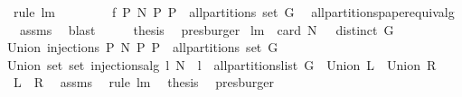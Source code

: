 \begin{isabellebody}
\ {\isacharparenleft}rule\ lm{}{}{\isacharparenright}\ \isamarkupfalse%
\isanewline
\ \ \isamarkupfalse%
\ \isamarkupfalse%
\ {\isachardoublequoteopen}{\isachardot}{\isachardot}{\isachardot}\ {\isacharequal}\ {\isacharbraceleft}{\isacharquery}f{}\ P\ N{\isacharbar}\ P{\isachardot}\ P\ {\isasymin}\ all{\isacharunderscore}partitions\ {\isacharparenleft}set\ G{\isacharparenright}{\isacharbraceright}{\isachardoublequoteclose}\ \isamarkupfalse%
\ all{\isacharunderscore}partitions{\isacharunderscore}paper{\isacharunderscore}equiv{\isacharunderscore}alg\isanewline
\ \ assms\ \isamarkupfalse%
\ blast\isanewline
\ \ \isamarkupfalse%
\ \isamarkupfalse%
\ {\isacharquery}thesis\ \isamarkupfalse%
\ presburger\isanewline
{}\isamarkupfalse%
%
\endisatagproof
{\isafoldproof}%
%
\isadelimproof
%
\endisadelimproof
\isanewline
\isanewline
{}\isamarkupfalse%
\ lm{}{}{\isacharcolon}\ \ {\isachardoublequoteopen}card\ N\ {\isachargreater}\ {}{\isachardoublequoteclose}\ {\isachardoublequoteopen}distinct\ G{\isachardoublequoteclose}\ \ \isanewline
{\isachardoublequoteopen}Union\ {\isacharbraceleft}injections\ P\ N{\isacharbar}\ P{\isachardot}\ P\ {\isasymin}\ all{\isacharunderscore}partitions\ {\isacharparenleft}set\ G{\isacharparenright}{\isacharbraceright}\ {\isacharequal}\isanewline
Union\ {\isacharparenleft}set\ {\isacharbrackleft}set\ {\isacharparenleft}injections{\isacharunderscore}alg\ l\ N{\isacharparenright}\ {\isachardot}\ l\ {\isasymleftarrow}\ all{\isacharunderscore}partitions{\isacharunderscore}list\ G{\isacharbrackright}{\isacharparenright}{\isachardoublequoteclose}\ {\isacharparenleft}\ {\isachardoublequoteopen}Union\ {\isacharquery}L\ {\isacharequal}\ Union\ {\isacharquery}R{\isachardoublequoteclose}{\isacharparenright}\isanewline
%
\isadelimproof
%
\endisadelimproof
%
\isatagproof
{}\isamarkupfalse%
\ {\isacharminus}\ \isamarkupfalse%
\ {\isachardoublequoteopen}{\isacharquery}L\ {\isacharequal}\ {\isacharquery}R{\isachardoublequoteclose}\ \isamarkupfalse%
\ assms\ \isamarkupfalse%
\ {\isacharparenleft}rule\ lm{}{}{\isacharparenright}\ \isamarkupfalse%
\ {\isacharquery}thesis\ \isamarkupfalse%
\ presburger\ \isamarkupfalse%
%
\endisatagproof

\end{isabellebody}
